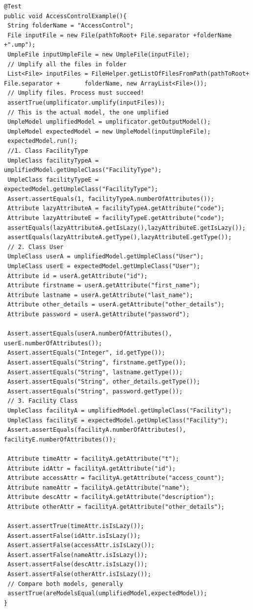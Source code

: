 \begin{lstlisting}[style=java,label={lst:acsExample},caption=Unit test to assert the Access Control Example.]
@Test
public void AccessControlExample(){
 String folderName = "AccessControl";
 File inputFile = new File(pathToRoot+ File.separator +folderName +".ump");
 UmpleFile inputUmpleFile = new UmpleFile(inputFile);
 // Umplify all the files in folder
 List<File> inputFiles = FileHelper.getListOfFilesFromPath(pathToRoot+ File.separator +       folderName, new ArrayList<File>());
 // Umplify files. Process must succeed!
 assertTrue(umplificator.umplify(inputFiles));
 // This is the actual model, the one umplified 
 UmpleModel umplifiedModel = umplificator.getOutputModel();
 UmpleModel expectedModel = new UmpleModel(inputUmpleFile);
 expectedModel.run();		
 //1. Class FacilityType
 UmpleClass facilityTypeA = umplifiedModel.getUmpleClass("FacilityType");
 UmpleClass facilityTypeE = expectedModel.getUmpleClass("FacilityType");		
 Assert.assertEquals(1, facilityTypeA.numberOfAttributes());
 Attribute lazyAttributeA = facilityTypeA.getAttribute("code");
 Attribute lazyAttributeE = facilityTypeE.getAttribute("code");	
 assertEquals(lazyAttributeA.getIsLazy(),lazyAttributeE.getIsLazy());
 assertEquals(lazyAttributeA.getType(),lazyAttributeE.getType());		
 // 2. Class User
 UmpleClass userA = umplifiedModel.getUmpleClass("User");
 UmpleClass userE = expectedModel.getUmpleClass("User");	
 Attribute id = userA.getAttribute("id");
 Attribute firstname = userA.getAttribute("first_name");
 Attribute lastname = userA.getAttribute("last_name");
 Attribute other_details = userA.getAttribute("other_details");
 Attribute password = userA.getAttribute("password");
		
 Assert.assertEquals(userA.numberOfAttributes(), userE.numberOfAttributes());
 Assert.assertEquals("Integer", id.getType());
 Assert.assertEquals("String", firstname.getType());
 Assert.assertEquals("String", lastname.getType());
 Assert.assertEquals("String", other_details.getType());
 Assert.assertEquals("String", password.getType());
 // 3. Facility Class
 UmpleClass facilityA = umplifiedModel.getUmpleClass("Facility");
 UmpleClass facilityE = expectedModel.getUmpleClass("Facility");
 Assert.assertEquals(facilityA.numberOfAttributes(), facilityE.numberOfAttributes());

 Attribute timeAttr = facilityA.getAttribute("t");
 Attribute idAttr = facilityA.getAttribute("id");
 Attribute accessAttr = facilityA.getAttribute("access_count");
 Attribute nameAttr = facilityA.getAttribute("name");
 Attribute descAttr = facilityA.getAttribute("description");
 Attribute otherAttr = facilityA.getAttribute("other_details");
		
 Assert.assertTrue(timeAttr.isIsLazy());
 Assert.assertFalse(idAttr.isIsLazy());
 Assert.assertFalse(accessAttr.isIsLazy());
 Assert.assertFalse(nameAttr.isIsLazy());
 Assert.assertFalse(descAttr.isIsLazy());
 Assert.assertFalse(otherAttr.isIsLazy());
 // Compare both models, generally
 assertTrue(areModelsEqual(umplifiedModel,expectedModel));
}
\end{lstlisting}

